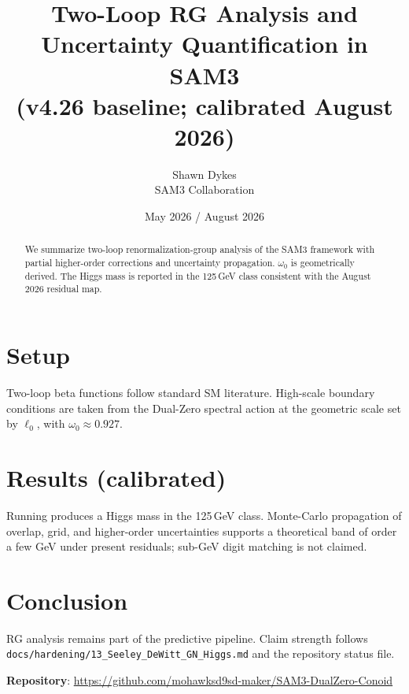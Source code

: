 \documentclass[11pt,a4paper]{article}
\title{\textbf{Two-Loop RG Analysis and Uncertainty Quantification in SAM3} \\ (v4.26 baseline; calibrated August 2026)}
\author{Shawn Dykes \\ SAM3 Collaboration}
\date{May 2026 / August 2026}
\begin{document}
\maketitle

\begin{center}
\end{center}

\vspace{1em}

\begin{abstract}
We summarize two-loop renormalization-group analysis of the SAM3 framework with partial higher-order corrections and uncertainty propagation. $\omega_0$ is geometrically derived. The Higgs mass is reported in the 125\,GeV class consistent with the August 2026 residual map.
\end{abstract}

\section{Setup}
Two-loop beta functions follow standard SM literature. High-scale boundary conditions are taken from the Dual-Zero spectral action at the geometric scale set by $\ell_0$, with $\omega_0\approx 0.927$.

\section{Results (calibrated)}
Running produces a Higgs mass in the 125\,GeV class. Monte-Carlo propagation of overlap, grid, and higher-order uncertainties supports a theoretical band of order a few GeV under present residuals; sub-GeV digit matching is not claimed.

\section{Conclusion}
RG analysis remains part of the predictive pipeline. Claim strength follows \texttt{docs/hardening/13\_Seeley\_DeWitt\_GN\_Higgs.md} and the repository status file.

\textbf{Repository}: \url{https://github.com/mohawksd9sd-maker/SAM3-DualZero-Conoid}
\end{document}
